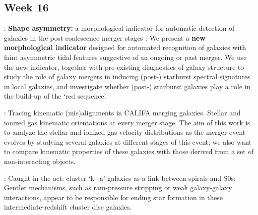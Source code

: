 \documentclass[ceqn,usenatbib,onecolumn]{mnras}
\begin{document}
\subsection{Week 16}
\par \citet{10.1093/mnras/stv2878} : {\textbf{Shape asymmetry:} a morphological indicator for automatic detection of galaxies in the post-coalescence merger stages} : We present a \textbf{new morphological indicator} designed for automated recognition of galaxies with faint asymmetric tidal features suggestive of an ongoing or past merger. We use the new indicator, together with pre-existing diagnostics of galaxy structure to study the role of galaxy mergers in inducing (post-) starburst spectral signatures in local galaxies, and investigate whether (post-) starburst galaxies play a role in the build-up of the ‘red sequence’.
\par \citet{2015A&A...582A..21B} : {Tracing kinematic (mis)alignments in CALIFA merging galaxies. Stellar and ionized gas kinematic orientations at every merger stage}. The aim of this work is to analyze the stellar and ionized gas velocity distributions as the merger event evolves by studying several galaxies at different stages of this event; we also want to compare kinematic properties of these galaxies with those derived from a set of non-interacting objects. 
\par \citet{2014MNRAS.438.1038R}: {Caught in the act: cluster `k+a' galaxies as a link between spirals and S0s}: Gentler mechanisms, such as ram-pressure stripping or weak galaxy-galaxy interactions, appear to be responsible for ending star formation in these intermediate-redshift cluster disc galaxies.
\end{document}
